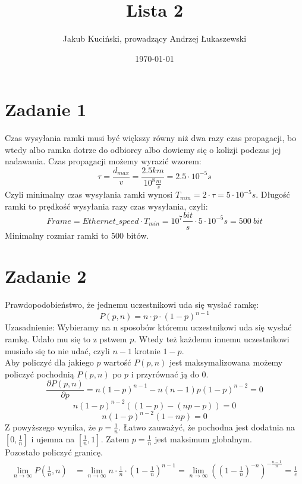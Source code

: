 \documentclass{article}
\title{Lista 2}
\author{Jakub Kuciński, prowadzący Andrzej Łukaszewski}
\date{\today}
\begin{document}
\maketitle
\tableofcontents

\section{Zadanie 1}
Czas wysyłania ramki musi być większy równy niż dwa razy czas propagacji, bo wtedy albo ramka dotrze do odbiorcy albo dowiemy się o kolizji podczas jej nadawania. Czas propagacji możemy wyrazić wzorem:
\begin{equation}
    \tau = \frac{d_{max}}{v} = \frac{2.5km}{10^8\frac{m}{s}} = 2.5\cdot 10^{−5} s
\end{equation}
Czyli minimalny czas wysyłania ramki wynosi $T_{min} = 2\cdot \tau = 5 \cdot 10^{−5} s$. Długość ramki to prędkość wysyłania razy czas wysyłania, czyli:
\begin{equation}
    Frame = Ethernet\_speed \cdot T_{min} = 10^7\frac{bit}{s} \cdot 5 \cdot 10^{−5} s = 500\:bit
\end{equation}
Minimalny rozmiar ramki to 500 bitów.
\section{Zadanie 2}
Prawdopodobieństwo, że jednemu uczestnikowi uda się wysłać ramkę:
\begin{equation}
    P(p,n) = n\cdot p \cdot (1-p)^{n-1}
\end{equation}
Uzasadnienie: Wybieramy na n sposobów któremu uczestnikowi uda się wysłać ramkę. Udało mu się to z pstwem $p$. Wtedy też każdemu innemu uczestnikowi musiało się to nie udać, czyli $n-1$ krotnie $1-p$.\\
Aby policzyć dla jakiego $p$ wartość $P(p,n)$ jest maksymalizowana możemy policzyć pochodnią $P(p,n)$ po $p$ i przyrównać ją do 0.
\begin{equation}
    \frac{\partial P(p,n)}{\partial p} = n(1-p)^{n-1} - n(n-1)p(1-p)^{n-2} = 0
\end{equation}
\begin{equation}
    n(1-p)^{n-2}((1-p) - (np - p)) = 0
\end{equation}
\begin{equation}
    n(1-p)^{n-2}(1-np) = 0
\end{equation}
Z powyższego wynika, że $p = \frac{1}{n}$. Łatwo zauważyć, że pochodna jest dodatnia na $[0, \frac{1}{n}]$ i ujemna na $[\frac{1}{n}, 1]$. Zatem $p = \frac{1}{n}$ jest maksimum globalnym.\\
Pozostało policzyć granicę.
\begin{align}
    \lim_{n \rightarrow \infty} P(\frac{1}{n},n) 
    &= \lim_{n \rightarrow \infty} n\cdot \frac{1}{n} \cdot (1-\frac{1}{n})^{n-1} = \lim_{n \rightarrow \infty} \left((1-\frac{1}{n})^{-n}\right)^{-\frac{n-1}{n}} = \frac{1}{e}
\end{align}
\end{document}
